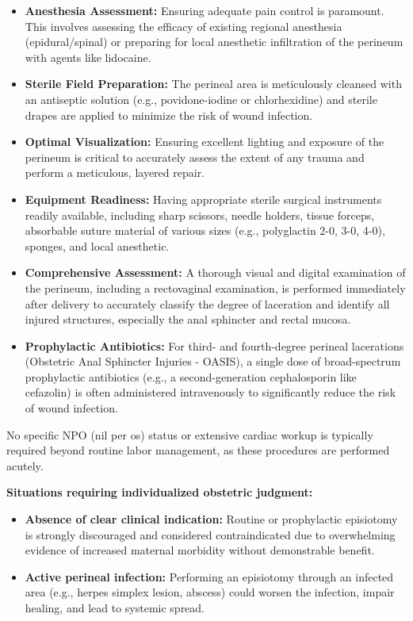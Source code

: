 \begin{itemize}
  \item \textbf{Anesthesia Assessment:} Ensuring adequate pain control is paramount. This involves assessing the efficacy of existing regional anesthesia (epidural/spinal) or preparing for local anesthetic infiltration of the perineum with agents like lidocaine.
  \item \textbf{Sterile Field Preparation:} The perineal area is meticulously cleansed with an antiseptic solution (e.g., povidone-iodine or chlorhexidine) and sterile drapes are applied to minimize the risk of wound infection.
  \item \textbf{Optimal Visualization:} Ensuring excellent lighting and exposure of the perineum is critical to accurately assess the extent of any trauma and perform a meticulous, layered repair.
  \item \textbf{Equipment Readiness:} Having appropriate sterile surgical instruments readily available, including sharp scissors, needle holders, tissue forceps, absorbable suture material of various sizes (e.g., polyglactin 2-0, 3-0, 4-0), sponges, and local anesthetic.
  \item \textbf{Comprehensive Assessment:} A thorough visual and digital examination of the perineum, including a rectovaginal examination, is performed immediately after delivery to accurately classify the degree of laceration and identify all injured structures, especially the anal sphincter and rectal mucosa.
  \item \textbf{Prophylactic Antibiotics:} For third- and fourth-degree perineal lacerations (Obstetric Anal Sphincter Injuries - OASIS), a single dose of broad-spectrum prophylactic antibiotics (e.g., a second-generation cephalosporin like cefazolin) is often administered intravenously to significantly reduce the risk of wound infection.
\end{itemize}

No specific NPO (nil per os) status or extensive cardiac workup is typically required beyond routine labor management, as these procedures are performed acutely.

\textbf{Situations requiring individualized obstetric judgment:}

\begin{itemize}
  \item \textbf{Absence of clear clinical indication:} Routine or prophylactic episiotomy is strongly discouraged and considered contraindicated due to overwhelming evidence of increased maternal morbidity without demonstrable benefit.
  \item \textbf{Active perineal infection:} Performing an episiotomy through an infected area (e.g., herpes simplex lesion, abscess) could worsen the infection, impair healing, and lead to systemic spread.
\end{itemize}

